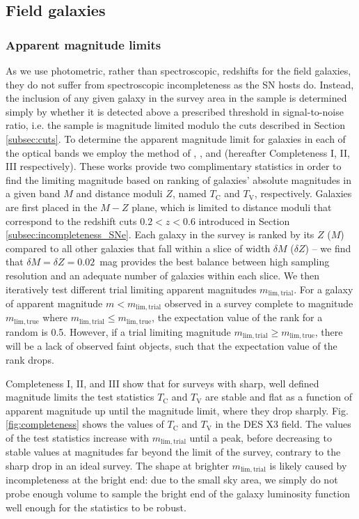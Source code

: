 \documentclass[fleqn,usenatbib]{mnras}
\begin{document}
\subsection{Field galaxies \label{subsec:incompleteness_field}}

\subsubsection{Apparent magnitude limits \label{subsubsec:mag_lims}}
As we use photometric, rather than spectroscopic, redshifts for the field galaxies, they do not suffer from spectroscopic incompleteness as the SN hosts do. Instead, the inclusion of any given galaxy in the survey area in the sample is determined simply by whether it is detected above a prescribed threshold in signal-to-noise ratio, i.e. the sample is magnitude limited modulo the cuts described in Section \ref{subsec:cuts}. To determine the apparent magnitude limit for galaxies in each of the optical bands we employ the method of \citet{Johnston2007}, \citet{Teodoro2010}, and \citet{Johnston2012} (hereafter Completeness I, II, III respectively). These works provide two complimentary statistics in order to find the limiting magnitude based on ranking of galaxies' absolute magnitudes in a given band $M$ and distance moduli $Z$, named  $T_{\mathrm{C}}$ and $T_{\mathrm{V}}$, respectively. Galaxies are first placed in the $M-Z$ plane, which is limited to distance moduli that correspond to the redshift cuts $0.2 <z<0.6$ introduced in Section \ref{subsec:incompleteness_SNe}. Each galaxy in the survey is ranked by its $Z$ ($M$) compared to all other galaxies that fall within a slice of width $\delta M$ ($\delta Z$) -- we find that $\delta M = \delta Z = 0.02$~mag provides the best balance between high sampling resolution and an adequate number of galaxies within each slice. We then iteratively test different trial limiting apparent magnitudes $m_{\mathrm{lim, trial}}$. For a galaxy of apparent magnitude $m < m_{\mathrm{lim, trial}}$ observed in a survey complete to magnitude $m_{\mathrm{lim, true}}$ where  $m_{\mathrm{lim, trial}} \leq m_{\mathrm{lim, true}}$, the expectation value of the rank for a random is 0.5. However, if a trial limiting magnitude $m_{\mathrm{lim, trial}} \geq m_{\mathrm{lim, true}}$, there will be a lack of observed faint objects, such that the expectation value of the rank drops. 

Completeness I, II, and III show that for surveys with sharp, well defined magnitude limits the test statistics $T_{\mathrm{C}}$ and $T_{\mathrm{V}}$ are stable and flat as a function of apparent magnitude up until the magnitude limit, where they drop sharply. Fig. \ref{fig:completeness} shows the values of $T_{\mathrm{C}}$ and $T_{\mathrm{V}}$ in the DES X3 field. The values of the test statistics increase with $m_{\mathrm{lim, trial}}$ until a peak, before decreasing to stable values at magnitudes far beyond the limit of the survey, contrary to the sharp drop in an ideal survey. The shape at brighter $m_{\mathrm{lim, trial}}$ is likely caused by incompleteness at the bright end: due to the small sky area, we simply do not probe enough volume to sample the bright end of the galaxy luminosity function well enough for the statistics to be robust. 
\end{document}
